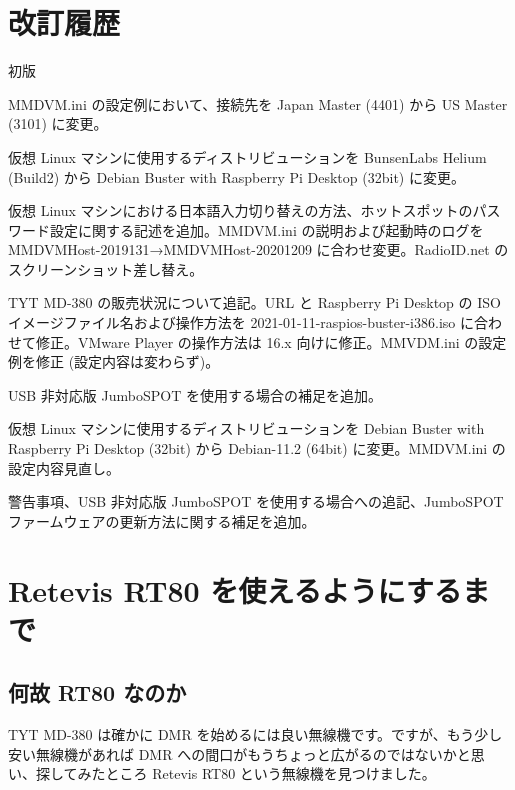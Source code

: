 \documentclass[a4j,oneside]{ujbook}
\begin{document}
\chapter{改訂履歴}
\begin{description}[style=nextline]
 \item[20190822] 初版
 \item[20200222] MMDVM.ini の設定例において、接続先を Japan Master (4401) から US Master (3101) に変更。
 \item[20200223] 仮想 Linux マシンに使用するディストリビューションを BunsenLabs Helium (Build2) から Debian Buster with Raspberry Pi Desktop (32bit) に変更。
 \item[20201213] 仮想 Linux マシンにおける日本語入力切り替えの方法、ホットスポットのパスワード設定に関する記述を追加。MMDVM.ini の説明および起動時のログを MMDVMHost-2019131→MMDVMHost-20201209 に合わせ変更。RadioID.net のスクリーンショット差し替え。
 \item[20210703] TYT MD-380 の販売状況について追記。URL と Raspberry Pi Desktop の ISO イメージファイル名および操作方法を 2021-01-11-raspios-buster-i386.iso に合わせて修正。VMware Player の操作方法は 16.x 向けに修正。MMVDM.ini の設定例を修正 (設定内容は変わらず)。
 \item[20220227] USB 非対応版 JumboSPOT を使用する場合の補足を追加。
 \item[20220320] 仮想 Linux マシンに使用するディストリビューションを Debian Buster with Raspberry Pi Desktop (32bit) から Debian-11.2 (64bit) に変更。MMDVM.ini の設定内容見直し。
 \item[20241012] 警告事項、USB 非対応版 JumboSPOT を使用する場合への追記、JumboSPOT ファームウェアの更新方法に関する補足を追加。
\end{description}

\appendix
\chapter{Retevis RT80 を使えるようにするまで}

\section{何故 RT80 なのか}

TYT MD-380 は確かに DMR を始めるには良い無線機です。ですが、もう少し安い無線機があれば DMR への間口がもうちょっと広がるのではないかと思い、探してみたところ Retevis RT80 という無線機を見つけました。
\end{document}
